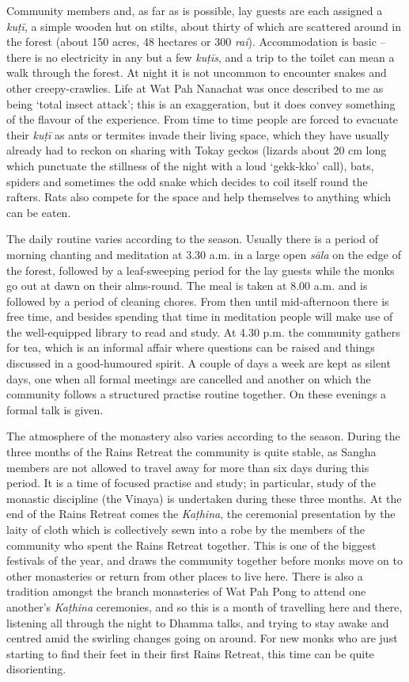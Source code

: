 Community members and, as far as is possible, lay guests are each
assigned a \emph{kuṭī}, a simple wooden hut on stilts, about thirty of
which are scattered around in the forest (about 150 acres, 48 hectares
or 300 \emph{rai}). Accommodation is basic --
there is no electricity in any but a few \emph{kuṭīs}, and a trip to the
toilet can mean a walk through the forest. At night it is not uncommon
to encounter snakes and other creepy-crawlies. Life at Wat Pah Nanachat
was once described to me as being `total insect attack'; this is an
exaggeration, but it does convey something of the flavour of the
experience. From time to time people are forced to evacuate their
\emph{kuṭī} as ants or termites invade their living space, which they
have usually already had to reckon on sharing with Tokay geckos (lizards about
20 cm long which punctuate the stillness of the night with a loud
`gekk-kko' call), bats, spiders and sometimes the odd snake which
decides to coil itself round the rafters. Rats also compete for the
space and help themselves to anything which can be eaten. 

The daily routine varies according to the season. Usually there is a
period of morning chanting and meditation at 3.30 a.m. in a large open
\emph{sāla} on the edge of the forest, followed by a leaf-sweeping
period for the lay guests while the monks go out at dawn on their
alms-round. The meal is taken at 8.00 a.m. and is followed by a period
of cleaning chores. From then until mid-afternoon there is free time, 
and besides spending that time in meditation people will make use of the
well-equipped library to read and study. At 4.30 p.m. the community
gathers for tea, which is an informal affair where questions can be
raised and things discussed in a good-humoured spirit. A couple of days
a week are kept as silent days, one when all formal meetings are
cancelled and another on which the community follows a structured
practise routine together. On these evenings a formal talk is given. 

The atmosphere of the monastery also varies according to the season. 
During the three months of the Rains Retreat the community is quite
stable, as Sangha members are not allowed to travel away for more than
six days during this period. It is a time of focused practise and study; 
in particular, study of the monastic discipline (the Vinaya) is
undertaken during these three months. At the end of the Rains Retreat
comes the \emph{Kaṭhina}, the ceremonial presentation by the laity of
cloth which is collectively sewn into a robe by the members of the
community who spent the Rains Retreat together. This is one of the
biggest festivals of the year, and draws the community together before
monks move on to other monasteries or return from other places to live
here. There is also a tradition amongst the branch monasteries of Wat
Pah Pong to attend one another's \emph{Kaṭhina} ceremonies, and so this is
a month of travelling here and there, listening all through the night to
Dhamma talks, and trying to stay awake and centred amid the swirling
changes going on around. For new monks who are just starting to find
their feet in their first Rains Retreat, this time can be quite
disorienting. 

